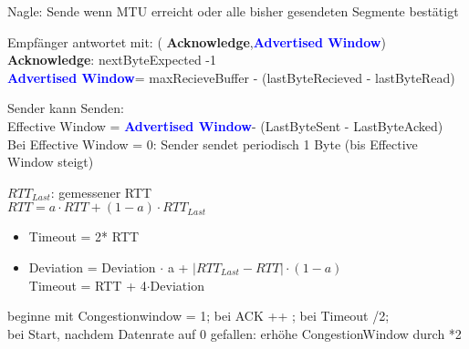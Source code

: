 Nagle: Sende wenn MTU erreicht oder alle bisher gesendeten Segmente bestätigt

\newcommand{\ack}{\textcolor{green!50!black!90!}{\textbf{Acknowledge}}}
\newcommand{\advert}{\textcolor{blue}{\textbf{Advertised Window}}}

Empfänger antwortet mit: ( \ack ,\advert) \\
\ack: nextByteExpected -1  \\
\advert = maxRecieveBuffer - (lastByteRecieved - lastByteRead)

Sender kann Senden:\\
Effective Window = \advert - (LastByteSent - LastByteAcked)\\
Bei Effective Window = 0: Sender sendet periodisch 1 Byte (bis Effective Window steigt)

$RTT_{Last}$: gemessener RTT\\
$RTT = a \cdot RTT + (1-a) \cdot RTT_{Last}$\\
\begin{minipage}{0.5\textwidth}
\begin{itemize}
\item Timeout = 2* RTT
\item Deviation = Deviation $\cdot$ a + $|RTT_{Last} -RTT| \cdot (1-a)$\\
Timeout = RTT + 4$\cdot$Deviation
\end{itemize}
\end{minipage}

beginne mit Congestionwindow = 1; bei ACK ++ ; bei Timeout /2;   \\
bei Start, nachdem Datenrate auf 0 gefallen: erhöhe CongestionWindow durch *2



